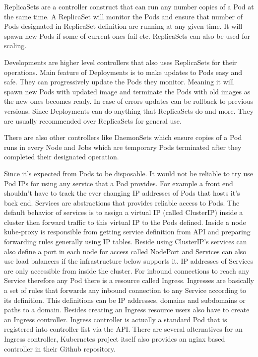 \documentclass[12pt,oneandhalf,chaparabic,ceng,ms,eng,oneside,pntc]{gsufbe}
\begin{document}
ReplicaSets are a controller construct that can run any number copies of a Pod at the same time. A 
ReplicaSet will monitor the Pods and ensure that number of Pods designated in ReplicaSet definition are
running at any given time. It will spawn new Pods if some of current ones fail etc. ReplicaSets can
also be used for scaling. 

Developments are higher level controllers that also uses ReplicaSets for their operations. Main feature
of Deployments is to make updates to Pods easy and safe. They can progressively update the Pods they
monitor. Meaning it will spawn new Pods with updated image and terminate the Pods with old images as
the new ones becomes ready. In case of errors updates can be rollback to previous versions. Since
Deployments can do anything that ReplicaSets do and more. They are usually recommended over ReplicaSets
for general use.

There are also other controllers like DaemonSets which ensure copies of a Pod runs in every Node and
Jobs which are temporary Pods terminated after they completed their designated operation.

Since it’s expected from Pods to be disposable. It would not be reliable to try use Pod IPs for using
any service that a Pod provides. For example a front end shouldn’t have to track the ever changing IP
addresses of Pods that hosts it’s back end. Services are abstractions that provides reliable access to
Pods. The default behavior of services is to assign a virtual IP (called ClusterIP) inside a cluster
then forward traffic to this virtual IP to the Pods defined. Inside a node kube-proxy is responsible
from getting service definition from API and preparing forwarding rules generally using IP tables.
Beside using ClusterIP’s services can also define a port in each node for access called NodePort and
Services can also use load balancers if the infrastructure below supports it. 
\cite{marmol_networking_2015}
IP addresses of Services are only accessible from inside the cluster. For inbound connections to reach
any Service therefore any Pod there is a resource called Ingress. Ingresses are basically a set of rules
that forwards any inbound connection to any Service according to its definition. This definitions can
be IP addresses, domains and subdomains or paths to a domain. Besides creating an Ingress resource
users also have to create an Ingress controller. Ingress controller is actually a standard Pod that is
registered into controller list via the API. There are several alternatives for an Ingress controller,
Kubernetes project itself also provides an nginx based controller in their Github repository.
\end{document}
